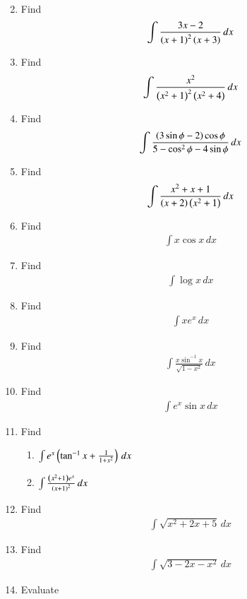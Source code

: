 \begin{enumerate}[label=\arabic*.,ref=\thesubsection.\theenumi]
\begin{align}
\end{align}
%
\item Find 
\begin{align}
\int \frac{3x-2}{\left(x+1\right)^2\left(x+3\right)}\,dx
\end{align}
%
\item Find 
\begin{align}
\int \frac{x^2}{\left(x^2+1\right)^2\left(x^2+4\right)}\,dx
\end{align}
%
\item Find 
\begin{align}
\int \frac{\left(3\sin \phi -2\right)\cos \phi}{5-\cos^2\phi - 4\sin \phi}\,dx
\end{align}
%
\item Find 
\begin{align}
\int \frac{x^2+x+1}{\left(x+2\right)\left(x^2+1\right)}\,dx
\end{align}
%
\item Find 
\begin{align}
\int x\cos x\,dx
\end{align}
%
\item Find 
\begin{align}
\int \log x\,dx
\end{align}
%
\item Find 
\begin{align}
\int xe^x\,dx
\end{align}
%
\item Find 
\begin{align}
\int \frac{x\sin^{-1}x}{\sqrt{1-x^2}}\,dx
\end{align}
%
\item Find 
\begin{align}
\int e^x \sin x\,dx
\end{align}
%
%
\item Find 
\begin{enumerate}
%
\item  $\int e^x\left(\tan^{-1}x+\frac{1}{1+x^2}\right)\,dx$
\item  $\int \frac{\left(x^2+1\right)e^x}{\left(x+1\right)^2}\,dx$
%
\end{enumerate}
%
%
\item Find 
\begin{align}
\int \sqrt{x^2+2x+5}\,dx
\end{align}
%
\item Find 
\begin{align}
\int \sqrt{3-2x-x^2}\,dx
\end{align}
%
\item Evaluate

\end{enumerate}
